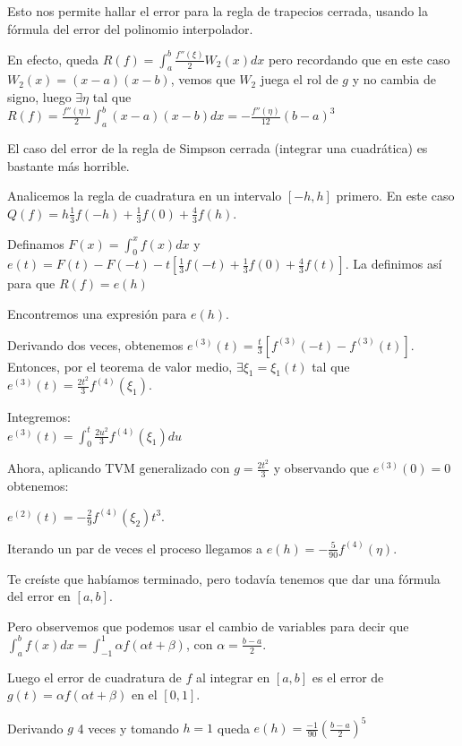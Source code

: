 \documentclass[10pt,a4paper,final]{report}
\begin{document}
\begin{observation}
Esto nos permite hallar el error para la regla de trapecios cerrada, usando la fórmula del error del polinomio interpolador.

En efecto, queda $R(f) = \int_a^b \frac{f''(\xi)}{2} W_2(x) dx$ pero recordando que en este caso $W_2(x)=(x-a)(x-b)$, vemos que $W_2$ juega el rol de $g$ y no cambia de signo, luego $\exists \eta$ tal que $R(f) = \frac{f''(\eta)}{2} \int_a^b (x-a)(x-b) dx = - \frac{f''(\eta)}{12} (b-a)^3$


El caso del error de la regla de Simpson cerrada (integrar una cuadrática) es bastante más horrible.

Analicemos la regla de cuadratura en un intervalo $[-h,h]$ primero. En este caso $Q(f)=h\frac{1}{3}f(-h) + \frac{1}{3}f(0) + \frac{4}{3}f(h)$.

Definamos $F(x) = \int_0^x f(x) dx$ y $e(t) = F(t) - F(-t) - t[\frac{1}{3}f(-t) + \frac{1}{3} f(0) + \frac{4}{3} f(t)]$. La definimos así para que $R(f)=e(h)$

Encontremos una expresión para $e(h)$.

Derivando dos veces, obtenemos $e^{(3)}(t) = \frac{t}{3}[f^{(3)}(-t)-f^{(3)}(t)]$.\\

Entonces, por el teorema de valor medio, $\exists \xi_1 = \xi_1(t)$ tal que $e^{(3)}(t) = \frac{2t^2}{3} f^{(4)}(\xi_1)$.

Integremos:\\

$e^{(3)}(t) = \int_0^t \frac{2u^2}{3} f^{(4)}(\xi_1) du$

Ahora, aplicando TVM generalizado con $g=\frac{2t^2}{3}$ y observando que $e^{(3)}(0)=0$ obtenemos:

$e^{(2)}(t) = -\frac{2}{9} f^{(4)}(\xi_2)t^3$.

Iterando un par de veces el proceso llegamos a $e(h) = -\frac{5}{90}f^{(4)}(\eta)$.

Te creíste que habíamos terminado, pero todavía tenemos que dar una fórmula del error en $[a,b]$.

Pero observemos que podemos usar el cambio de variables para decir que $\int_a^b f(x) dx = \int_{-1}^1 \alpha f(\alpha t + \beta)$, con $\alpha = \frac{b-a}{2}$.

Luego el error de cuadratura de $f$ al integrar en $[a,b]$ es el error de $g(t)=\alpha f(\alpha t + \beta)$ en el $[0,1]$.

Derivando $g$ 4 veces y tomando $h=1$ queda $e(h) = \frac{-1}{90} (\frac{b-a}{2})^5$

\end{observation}
\end{document}

